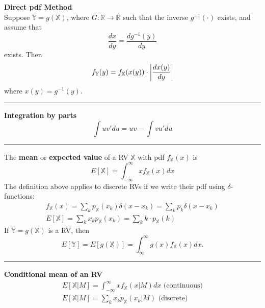 \documentclass{article}
\DeclarePairedDelimiter\abs{\lvert}{\rvert}
\providecommand{\X}{\mathbb{X}}
\providecommand{\Y}{\mathbb{Y}}
\providecommand{\R}{\mathbb{R}}
\begin{document}
\begin{multicols*}{3}
        \textbf{Direct pdf Method}\\
        Suppose $\Y=g(\X)$, where $G:\R\rightarrow\R$ such that the inverse $g^{-1}(\cdot)$ exists, and assume that
        \begin{equation*}
            \frac{dx}{dy} = \frac{dg^{-1}(y)}{dy}
        \end{equation*}
        exists.
        Then
        \begin{equation*}
            f_\Y(y) = f_\X(x(y)) \cdot \abs*{\frac{dx(y)}{dy}}
        \end{equation*}
        where $x(y)=g^{-1}(y)$.

        \noindent\rule{\columnwidth}{0.4pt}

        \textbf{Integration by parts}
        \begin{equation*}
            \int u v' du = uv - \int v u' du
        \end{equation*}

        \noindent\rule{\columnwidth}{0.4pt}

        The \textbf{mean} or \textbf{expected value} of a RV $\X$ with pdf $f_\X(x)$ is
        \begin{equation*}
            E[\X] = \int_{-\infty}^{\infty}  xf_{\X}(x)dx
        \end{equation*}
        The definition above applies to discrete RVs if we write their pdf using $\delta$-functions:
        \begin{equation*}
            \begin{gathered}
                f_{\X}(x) = \sum_k p_\X(x_k)\delta(x-x_k) = \sum_{k}p_k\delta(x-x_k)\\
                E[\X] = \sum_k x_k p_{\X}(x_k) = \sum_k k\cdot p_{\X}(k)
            \end{gathered}
        \end{equation*}
        If $\Y=g(\X)$ is a RV, then
        \begin{equation*}
            E[\Y] = E[g(\X)] = \int_{\infty}^{\infty} g(x) f_{\X}(x)dx.
        \end{equation*}

        \noindent\rule{\columnwidth}{0.4pt}

        \textbf{Conditional mean of an RV}
        \begin{equation*}
            \begin{gathered}
                E[\X|M] = \int_{-\infty}^{\infty} xf_{\X}(x|M)dx \text{ (continuous)}\\
                E[\X|M] = \sum_k x_k p_{\X}(x_k|M) \text{ (discrete)}
            \end{gathered}
        \end{equation*}


\end{multicols*}
\end{document}
